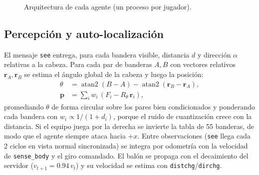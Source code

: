 \documentclass[conference,10pt]{IEEEtran}
\begin{document}
\begin{figure}[t]
\centering
{}
\caption{Arquitectura de cada agente (un proceso por jugador).}
\label{fig:arq}
\vspace{-1em}
\end{figure}

\subsection{Percepción y auto-localización}
El mensaje \texttt{see} entrega, para cada bandera visible, distancia $d$ y
dirección $\alpha$ relativas a la cabeza. Para cada par de banderas $A,B$
con vectores relativos $\mathbf r_A,\mathbf r_B$ se estima el ángulo global de
la cabeza y luego la posición:
\begin{align}
\theta&=\operatorname{atan2}(B-A)-\operatorname{atan2}(\mathbf r_B-\mathbf r_A),\\
\mathbf p&=\textstyle\sum_i w_i\,(F_i-R_\theta\,\mathbf r_i),
\end{align}
promediando $\theta$ de forma circular sobre los pares bien condicionados y
ponderando cada bandera con $w_i\propto 1/(1+d_i)$, porque el ruido de
cuantización crece con la distancia. Si el equipo juega por la derecha se
invierte la tabla de 55 banderas, de modo que el agente siempre ataca hacia
$+x$. Entre observaciones (\texttt{see} llega cada 2 ciclos en vista normal
sincronizada) se integra por odometría con la velocidad de \texttt{sense\_body}
y el giro comandado. El balón se propaga con el decaimiento del servidor
($v_{t+1}=0.94\,v_t$) y su velocidad se estima con
\texttt{distchg}/\texttt{dirchg}.
\end{document}
